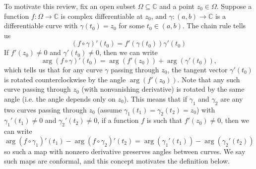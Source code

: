 To motivate this review, fix an open subset $\Omega\subseteq \mathbb{C}$ and a point $z_0\in \Omega$. Suppose a function $f: \Omega\rightarrow \mathbb{C}$ is complex differentiable at $z_0$, and $\gamma:(a,b)\to\mathbb{C}$ is a differentiable curve with $\gamma(t_0)=z_0$ for some $t_0\in(a,b)$. The chain rule tells us \begin{equation}
    (f\circ\gamma)'(t_0)=f'(\gamma(t_0))\gamma'(t_0)
\end{equation}
If $f'(z_0)\neq 0$ and $\gamma'(t_0)\neq 0$, then we can write \begin{equation}
    \arg(f\circ\gamma)'(t_0)=\arg(f'(z_0))+\arg(\gamma'(t_0)),\label{argsplit}
\end{equation} which tells us that for any curve $\gamma$ passing through $z_0$, the tangent vector $\gamma'(t_0)$ is rotated counterclockwise by the angle $\arg(f'(z_0))$. Note that any such curve passing through $z_0$ (with nonvanishing derivative) is rotated by the same angle (i.e. the angle depends only on $z_0$). This means that if $\gamma_1$ and $\gamma_2$ are any two curves passing through $z_0$ (assume $\gamma_1(t_1)=\gamma_2(t_2)=z_0$) with $\gamma_1'(t_1)\neq0 $ and $\gamma_2'(t_2)\neq 0$, if a function $f$ is such that $f'(z_0)\neq 0$, then we can write \begin{equation}\arg(f\circ\gamma_1)'(t_1)-\arg(f\circ\gamma_2)'(t_2)=\arg(\gamma_1'(t_1))-\arg(\gamma_2'(t_2))\end{equation} so such a map with nonzero derivative preserves angles between curves. We say such maps are conformal, and this concept motivates the definition below.

